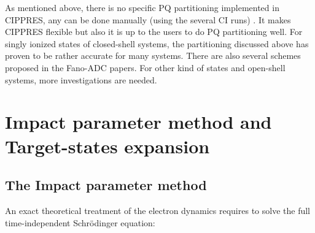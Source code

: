 \documentclass[a4paper, 10 pt]{report}
\begin{document}
As mentioned above, there is no specific PQ partitioning implemented in CIPPRES, any can be done manually (using the several CI runs) . It makes CIPPRES flexible but also it is up to the users to do PQ partitioning well. For singly ionized states of closed-shell systems, the partitioning discussed above has proven to be rather accurate for many systems. There are also several schemes proposed in the Fano-ADC papers. For other kind of states and open-shell systems, more investigations are needed.

\section{Impact parameter method and Target-states expansion}

\subsection{The Impact parameter method}
An exact theoretical treatment of the electron dynamics requires to solve the full time-independent Schr\"odinger equation:
\end{document}
